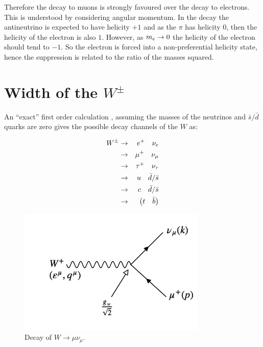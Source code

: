 Therefore the decay to muons is strongly favoured over the decay to electrons.  This is understood by considering angular momentum.  In the decay the antineutrino is expected to have helicity $+1$ and as the $\pi$ has helicity $0$, then the helicity of the electron is also $1$.  However, as $m_{e}\to 0$ the helicity of the electron should tend to $-1$.  So the electron is forced into a non-preferential helicity state, hence the suppression is related to the ratio of the masses squared.

\section{Width of the \texorpdfstring{$W^{\pm}$}{Wpm}}

An ``exact'' first order calculation , assuming the masses of the neutrinos and $\bar{s}/\bar{d}$ quarks are zero gives the possible decay channels of the $W$ as:

\begin{eqnarray*}
  W^{\pm} & \to & e^+ \quad \nu_{e} \\
  & \to & \mu^+ \quad \nu_{\mu} \\
  & \to & \tau^+ \quad \nu_{\tau} \\
  & \to & u \quad \bar{d}/\bar{s} \\
  & \to & c \quad \bar{d}/\bar{s} \\
  & \to & \left( t \quad \bar{b}\right)
\end{eqnarray*}

\begin{figure}[!htb]
  \begin{center}
    \includegraphics[width=0.8\textwidth]{images/web_feynman/image_55.png}
    \caption[Decay of $W\to\mu\nu_\mu$]{Decay of $W\to\mu\nu_\mu$.}
    \label{fig:ch12_WMuNu}
  \end{center}
\end{figure}

